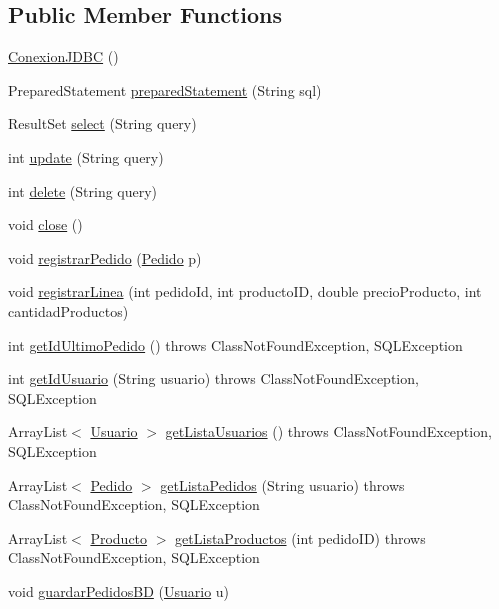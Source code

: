 \subsection*{Public Member Functions}
\begin{DoxyCompactItemize}
\item 
\mbox{\hyperlink{classmysql_1_1_conexion_j_d_b_c_a276e06b39d9d5fc051329194741b2f7c}{Conexion\+J\+D\+BC}} ()
\item 
Prepared\+Statement \mbox{\hyperlink{classmysql_1_1_conexion_j_d_b_c_a342d326d6f6c9831bb117afccb912a04}{prepared\+Statement}} (String sql)
\item 
Result\+Set \mbox{\hyperlink{classmysql_1_1_conexion_j_d_b_c_a77f0c70a90a3e174114586b131f10909}{select}} (String query)
\item 
int \mbox{\hyperlink{classmysql_1_1_conexion_j_d_b_c_a5a0abe91b83748401d0a630817c15e83}{update}} (String query)
\item 
int \mbox{\hyperlink{classmysql_1_1_conexion_j_d_b_c_a7cb683b19298ad4ccda2ef51abb68302}{delete}} (String query)
\item 
void \mbox{\hyperlink{classmysql_1_1_conexion_j_d_b_c_a05e552aeb511582e81c6dd6cba120182}{close}} ()
\item 
void \mbox{\hyperlink{classmysql_1_1_conexion_j_d_b_c_a6d8f0cd0e2046952d9771d379c16562a}{registrar\+Pedido}} (\mbox{\hyperlink{classobjetos_1_1_pedido}{Pedido}} p)
\item 
void \mbox{\hyperlink{classmysql_1_1_conexion_j_d_b_c_ab41e6e25d89ab9a807e9729fcdf5818f}{registrar\+Linea}} (int pedido\+Id, int producto\+ID, double precio\+Producto, int cantidad\+Productos)
\item 
int \mbox{\hyperlink{classmysql_1_1_conexion_j_d_b_c_abbadbe682819495c2b2afd962afba245}{get\+Id\+Ultimo\+Pedido}} ()  throws Class\+Not\+Found\+Exception, S\+Q\+L\+Exception 
\item 
int \mbox{\hyperlink{classmysql_1_1_conexion_j_d_b_c_a4dde03f79391c9a52f7a84e281c5a696}{get\+Id\+Usuario}} (String usuario)  throws Class\+Not\+Found\+Exception, S\+Q\+L\+Exception 
\item 
Array\+List$<$ \mbox{\hyperlink{classobjetos_1_1_usuario}{Usuario}} $>$ \mbox{\hyperlink{classmysql_1_1_conexion_j_d_b_c_afa9f004689cee7a90e6a19c359409e04}{get\+Lista\+Usuarios}} ()  throws Class\+Not\+Found\+Exception, S\+Q\+L\+Exception 
\item 
Array\+List$<$ \mbox{\hyperlink{classobjetos_1_1_pedido}{Pedido}} $>$ \mbox{\hyperlink{classmysql_1_1_conexion_j_d_b_c_a38333a2f31d016faaf14c08901c6ffea}{get\+Lista\+Pedidos}} (String usuario)  throws Class\+Not\+Found\+Exception, S\+Q\+L\+Exception 
\item 
Array\+List$<$ \mbox{\hyperlink{classobjetos_1_1_producto}{Producto}} $>$ \mbox{\hyperlink{classmysql_1_1_conexion_j_d_b_c_a93e878bd79640edb42bbaa5e11217f8e}{get\+Lista\+Productos}} (int pedido\+ID)  throws Class\+Not\+Found\+Exception, S\+Q\+L\+Exception 
\item 
void \mbox{\hyperlink{classmysql_1_1_conexion_j_d_b_c_a5dbbd093ae378b5b023127bdf0ccf88e}{guardar\+Pedidos\+BD}} (\mbox{\hyperlink{classobjetos_1_1_usuario}{Usuario}} u)
\end{DoxyCompactItemize}


